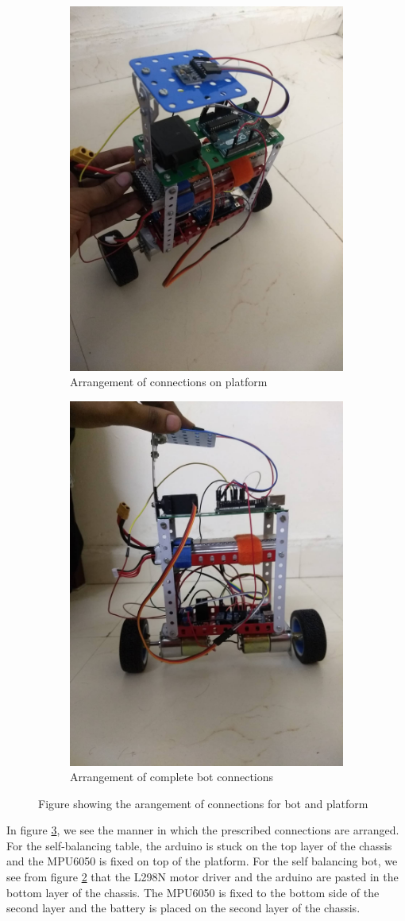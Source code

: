 \begin{figure}
\centering
\begin{subfigure}{.5\textwidth}
  \centering
  \includegraphics[width=.4\linewidth, scale = 2]{images/bot1}
  \caption{Arrangement of connections on platform}
  \label{fig:bot1}
\end{subfigure}%
\begin{subfigure}{.5\textwidth}
  \centering
  \includegraphics[width=.4\linewidth, scale = 2]{images/bot4}
  \caption{Arrangement of complete bot connections}
  \label{fig:bot2}
\end{subfigure}
\caption{Figure showing the arangement of connections for bot and platform}
\label{fig:combination}
\end{figure}

In figure \ref{fig:combination}, we see the manner in which the prescribed connections are arranged. For the self-balancing table, the arduino is stuck on the top layer of the chassis and the MPU6050 is fixed on top of the platform. \newline
For the self balancing bot, we see from figure \ref{fig:bot2} that the L298N motor driver and the arduino are pasted in the bottom layer of the chassis. The MPU6050 is fixed to the bottom side of the second layer and the battery is placed on the second layer of the chassis.

